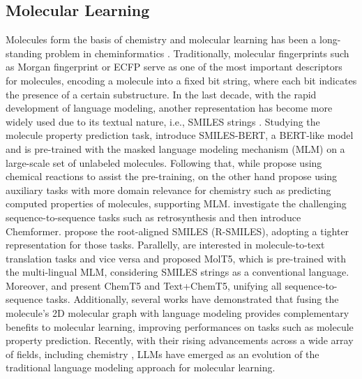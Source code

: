 \subsection{Molecular Learning}
Molecules form the basis of chemistry and molecular learning has been a long-standing problem in cheminformatics \cite{baum2021artificial, hustrategies, xiamole, pei2023biot5, pei-etal-2024-biot5}. Traditionally, molecular fingerprints such as Morgan fingerprint \cite{morgan1965generation} or ECFP \cite{rogers2010extended} serve as one of the most important descriptors for molecules, encoding a molecule into a fixed bit string, where each bit indicates the presence of a certain substructure. In the last decade, with the rapid development of language modeling, another representation has become more widely used due to its textual nature, i.e., SMILES strings \cite{weininger1988smiles}. Studying the molecule property prediction task, \citet{wang2019smiles} introduce SMILES-BERT, a BERT-like model \cite{devlin2019bert} and is pre-trained with the masked language modeling mechanism (MLM) on a large-scale set of unlabeled molecules. Following that, while \citet{wang2021chemical} propose using chemical reactions to assist the pre-training, \citet{ahmad2022chemberta} on the other hand propose using auxiliary tasks with more domain relevance for chemistry such as predicting computed properties of molecules, supporting MLM. \citet{irwin2022chemformer} investigate the challenging sequence-to-sequence tasks such as retrosynthesis and then introduce Chemformer. \citet{zhong2022root} propose the root-aligned SMILES (R-SMILES), adopting a tighter representation for those tasks. Parallelly, \citet{edwards2022translation} are interested in molecule-to-text translation tasks and vice versa and proposed MolT5, which is pre-trained with the multi-lingual MLM, considering SMILES strings as a conventional language. Moreover, \citet{lu2022unified} and \citet{christofidellis2023unifying} present ChemT5 and Text+ChemT5, unifying all sequence-to-sequence tasks. Additionally, several works \cite{guo2020graseq, liu2023prediction} have demonstrated that fusing the molecule’s 2D molecular graph with language modeling provides complementary benefits to molecular learning, improving performances on tasks such as molecule property prediction. Recently, with their rising advancements across a wide array of fields, including chemistry \cite{castro2023large, achiam2023gpt}, LLMs have emerged as an evolution of the traditional language modeling approach for molecular learning. 

